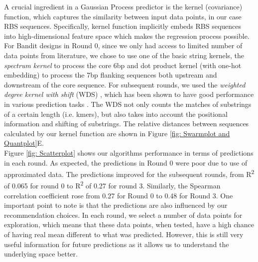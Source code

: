 \documentclass{article}
\begin{document}
A crucial ingredient in a Gaussian Process predictor \cite{Rasmussen2004} is the kernel (covariance) function, which captures the similarity between input data points, in our case RBS sequences.
Specifically, kernel function implicitly embeds RBS sequences into high-dimensional feature space which makes the regression process possible.
For Bandit designs in Round 0, since we only had access to limited number of data points from literature, we chose to use one of the basic string kernels, the \textit{spectrum kernel} \cite{leslie2001spectrum} to process the core 6bp and dot product kernel \cite{Rasmussen2004} (with one-hot embedding) to process the 7bp flanking sequences both upstream and downstream of the core sequence.
For subsequent rounds, we used the \textit{weighted degree kernel with shift} (WDS) \cite{ratsch_rase_2005_wds}, which has been shown to have good performance in various prediction tasks \cite{Ben-Hur2008}.
The WDS not only counts the matches of substrings of a certain length (i.e. kmers), but also takes into account the positional information and shifting of substrings.
The relative distances between sequences calculated by our kernel function are shown in Figure \ref{fig: Swarmplot and Quantplot}E.\\

Figure \ref{fig: Scatterplot} shows our algorithms performance in terms of predictions in each round. 
As expected, the predictions in Round 0 were poor due to use of approximated data. 
The predictions improved for the subsequent rounds, from R\textsuperscript{2} of 0.065 for round 0 to R\textsuperscript{2} of 0.27 for round 3.
Similarly, the Spearman correlation coefficient rose from 0.27 for Round 0 to 0.48 for Round 3.
One important point to note is that the predictions are also influenced by our recommendation choices. 
In each round, we select a number of data points for exploration, which means that these data points, when tested, have a high chance of having real mean different to what was predicted.
However, this is still very useful information for future predictions as it allows us to understand the underlying space better.
    
\end{document}
